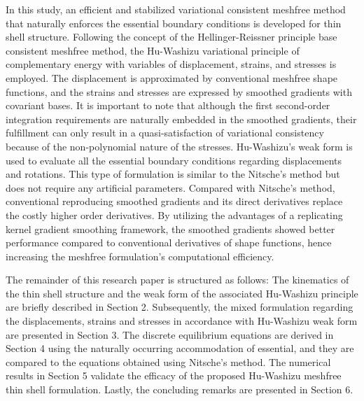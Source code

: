 In this study, an efficient and stabilized variational consistent meshfree method that naturally enforces the essential boundary conditions is developed for thin shell structure. Following the concept of the Hellinger-Reissner principle base consistent meshfree method, the Hu-Washizu variational principle of complementary energy with variables of displacement, strains, and stresses is employed. The displacement is approximated by conventional meshfree shape functions, and the strains and stresses are expressed by smoothed gradients with covariant bases. It is important to note that although the first second-order integration requirements are naturally embedded in the smoothed gradients, their fulfillment can only result in a quasi-satisfaction of variational consistency because of the non-polynomial nature of the stresses. Hu-Washizu's weak form is used to evaluate all the essential boundary conditions regarding displacements and rotations. This type of formulation is similar to the Nitsche's method but does not require any artificial parameters. Compared with Nitsche’s method, conventional reproducing smoothed gradients and its direct derivatives replace the costly higher order derivatives. By utilizing the advantages of a replicating kernel gradient smoothing framework, the smoothed gradients showed better performance compared to conventional derivatives of shape functions, hence increasing the meshfree formulation's computational efficiency.

The remainder of this research paper is structured as follows: The kinematics of the thin shell structure and the weak form of the associated Hu-Washizu principle are briefly described in Section 2. Subsequently, the mixed formulation regarding the displacements, strains and stresses in accordance with Hu-Washizu weak form are presented in Section 3. The discrete equilibrium equations are derived in Section 4 using the naturally occurring accommodation of essential, and they are compared to the equations obtained using Nitsche's method. The numerical results in Section 5 validate the efficacy of the proposed Hu-Washizu meshfree thin shell formulation. Lastly, the concluding remarks are presented in Section 6.

